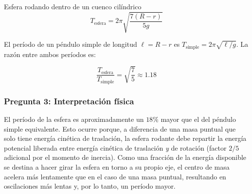 \begin{solucion}{Esfera rodando dentro de un cuenco cilíndrico}
$$\boxed{T_{\text{esfera}} = 2\pi\sqrt{\frac{7(R-r)}{5g}}}$$

El período de un péndulo simple de longitud $\ell = R-r$ es $T_{\text{simple}} = 2\pi\sqrt{\ell/g}$. La razón entre ambos períodos es:

$$\frac{T_{\text{esfera}}}{T_{\text{simple}}} = \sqrt{\frac{7}{5}} \approx 1.18$$

\subsubsection*{Pregunta 3: Interpretación física}

El período de la esfera es aproximadamente un $18\%$ mayor que el del péndulo simple equivalente. Esto ocurre porque, a diferencia de una masa puntual que solo tiene energía cinética de traslación, la esfera rodante debe repartir la energía potencial liberada entre energía cinética de traslación \emph{y} de rotación (factor $2/5$ adicional por el momento de inercia). Como una fracción de la energía disponible se destina a hacer girar la esfera en torno a su propio eje, el centro de masa acelera más lentamente que en el caso de una masa puntual, resultando en oscilaciones más lentas y, por lo tanto, un período mayor.
\end{solucion}
